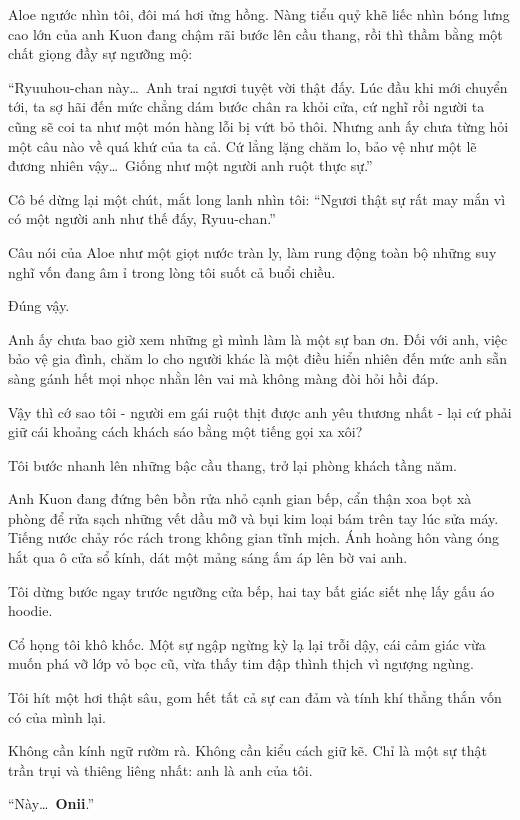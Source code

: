 ﻿\documentclass[../main.tex]{subfiles}
\begin{document}
Aloe ngước nhìn tôi, đôi má hơi ửng hồng. Nàng tiểu quỷ khẽ liếc nhìn bóng lưng cao lớn của anh Kuon đang chậm rãi bước lên cầu thang, rồi thì thầm bằng một chất giọng đầy sự ngưỡng mộ:

``Ryuuhou-chan này\dots\ Anh trai ngươi tuyệt vời thật đấy. Lúc đầu khi mới chuyển tới, ta sợ hãi đến mức chẳng dám bước chân ra khỏi cửa, cứ nghĩ rồi người ta cũng sẽ coi ta như một món hàng lỗi bị vứt bỏ thôi. Nhưng anh ấy chưa từng hỏi một câu nào về quá khứ của ta cả. Cứ lẳng lặng chăm lo, bảo vệ như một lẽ đương nhiên vậy\dots\ Giống như một người anh ruột thực sự.''

Cô bé dừng lại một chút, mắt long lanh nhìn tôi: ``Ngươi thật sự rất may mắn vì có một người anh như thế đấy, Ryuu-chan.''

Câu nói của Aloe như một giọt nước tràn ly, làm rung động toàn bộ những suy nghĩ vốn đang âm ỉ trong lòng tôi suốt cả buổi chiều.

Đúng vậy.

Anh ấy chưa bao giờ xem những gì mình làm là một sự ban ơn. Đối với anh, việc bảo vệ gia đình, chăm lo cho người khác là một điều hiển nhiên đến mức anh sẵn sàng gánh hết mọi nhọc nhằn lên vai mà không màng đòi hỏi hồi đáp.

Vậy thì cớ sao tôi - người em gái ruột thịt được anh yêu thương nhất - lại cứ phải giữ cái khoảng cách khách sáo bằng một tiếng gọi xa xôi?

Tôi bước nhanh lên những bậc cầu thang, trở lại phòng khách tầng năm.

Anh Kuon đang đứng bên bồn rửa nhỏ cạnh gian bếp, cẩn thận xoa bọt xà phòng để rửa sạch những vết dầu mỡ và bụi kim loại bám trên tay lúc sửa máy. Tiếng nước chảy róc rách trong không gian tĩnh mịch. Ánh hoàng hôn vàng óng hắt qua ô cửa sổ kính, dát một mảng sáng ấm áp lên bờ vai anh.

Tôi dừng bước ngay trước ngưỡng cửa bếp, hai tay bất giác siết nhẹ lấy gấu áo hoodie.

Cổ họng tôi khô khốc. Một sự ngập ngừng kỳ lạ lại trỗi dậy, cái cảm giác vừa muốn phá vỡ lớp vỏ bọc cũ, vừa thấy tim đập thình thịch vì ngượng ngùng.

Tôi hít một hơi thật sâu, gom hết tất cả sự can đảm và tính khí thẳng thắn vốn có của mình lại.

Không cần kính ngữ rườm rà. Không cần kiểu cách giữ kẽ. Chỉ là một sự thật trần trụi và thiêng liêng nhất: anh là anh của tôi.

``Này\dots\ \textbf{Onii}.''
\end{document}
